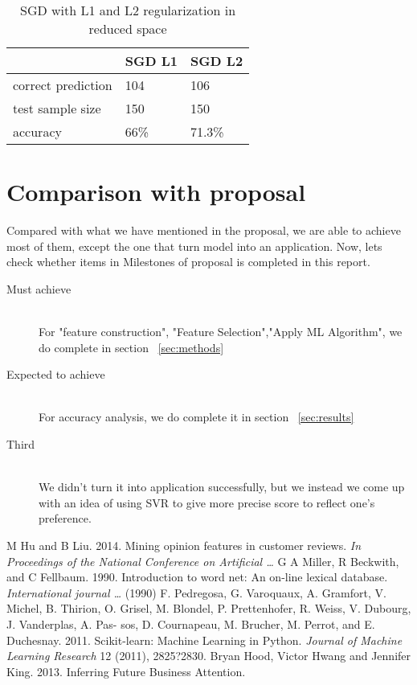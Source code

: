\documentclass[11pt,letterpaper]{article}
\begin{document}
\begin{center}
   \begin{table}
    \begin{tabular}{ | l | l  | p{2cm} |}
    \hline
     & SGD L1& SGD L2 \\ \hline
    correct prediction& 104 & 106  \\ \hline
    test sample size& 150 &150  \\ \hline
    accuracy & 66\% &71.3\%\\ \hline
    \end{tabular}
    \caption{SGD with L1 and L2 regularization in reduced space}
    \end{table}
\end{center}

\vspace{-2em}
\section{Comparison with proposal}
Compared with what we have mentioned in the proposal, we are able to achieve most of them, except the one that turn model into an application. Now, lets check whether items in Milestones of proposal is completed in this report. 
\vspace{-1em}
\begin{description}
  \item[Must achieve] \hfill \\
  For "feature construction", "Feature Selection","Apply ML Algorithm", we do complete in section ~\ref{sec:methods}
  \vspace{-1em}
  \item[Expected to achieve] \hfill \\
  For accuracy analysis, we do complete it in section ~\ref{sec:results}
  \vspace{-1em}
  \item[Third] \hfill \\
  We didn't turn it into application successfully, but we instead we come up with an idea of using SVR to give more precise score to reflect one's preference. 
\end{description}



\vspace{-2em}

\begin{thebibliography}{}
 M Hu and B Liu. 2014. Mining opinion features in customer reviews. \emph{In Proceedings of the National Conference on Artificial \ldots}  
 G A Miller, R Beckwith, and C Fellbaum. 1990. Introduction to word net: An on-line lexical database. \emph{International journal \ldots} (1990)
 F. Pedregosa, G. Varoquaux, A. Gramfort, V. Michel, B. Thirion, O. Grisel, M. Blondel, P. Prettenhofer, R. Weiss, V. Dubourg, J. Vanderplas, A. Pas- sos, D. Cournapeau, M. Brucher, M. Perrot, and E. Duchesnay. 2011. Scikit-learn: Machine Learning in Python. \emph{Journal of Machine Learning Research} 12 (2011), 2825?2830.
 Bryan Hood, Victor Hwang and Jennifer King. 2013. Inferring Future Business Attention.


\end{thebibliography}
\end{document}
